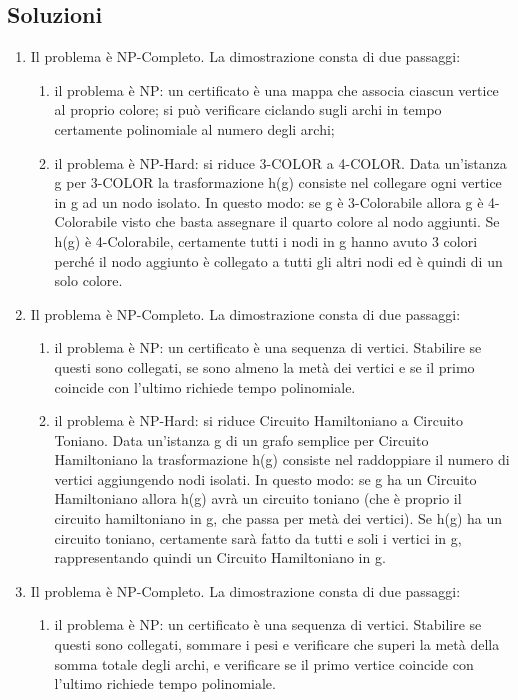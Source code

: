 \documentclass[a4paper,11pt]{article}
\begin{document}
\subsection{Soluzioni}
\begin{enumerate}
    \item Il problema è NP-Completo. La dimostrazione consta di due passaggi:
    \begin{enumerate}
    \item il problema è NP: un certificato è una mappa che associa ciascun vertice al proprio colore; si può verificare ciclando sugli archi in tempo certamente polinomiale al numero degli archi; 
    \item il problema è NP-Hard: si riduce 3-COLOR a 4-COLOR. Data un'istanza g per 3-COLOR la trasformazione h(g) consiste nel collegare ogni vertice in g ad un nodo isolato. In questo modo: se g è 3-Colorabile allora g è 4-Colorabile visto che basta assegnare il quarto colore al nodo aggiunti. Se h(g) è 4-Colorabile, certamente tutti i nodi in g hanno avuto 3 colori perché il nodo aggiunto è collegato a tutti gli altri nodi ed è quindi di un solo colore.
    \end{enumerate}
    \item Il problema è NP-Completo. La dimostrazione consta di due passaggi:
    \begin{enumerate}
    \item il problema è NP: un certificato è una sequenza di vertici. Stabilire se questi sono collegati, se sono almeno la metà dei vertici e se il primo coincide con l'ultimo richiede tempo polinomiale.
    \item il problema è NP-Hard: si riduce Circuito Hamiltoniano a Circuito Toniano. Data un'istanza g di un grafo semplice per Circuito Hamiltoniano la trasformazione h(g) consiste nel raddoppiare il numero di vertici aggiungendo nodi isolati. In questo modo: se g ha un Circuito Hamiltoniano allora h(g) avrà un circuito toniano (che è proprio il circuito hamiltoniano in g, che passa per metà dei vertici). Se h(g) ha un circuito toniano, certamente sarà fatto da tutti e soli i vertici in g, rappresentando quindi un Circuito Hamiltoniano in g.
    \end{enumerate}
    \item Il problema è NP-Completo. La dimostrazione consta di due passaggi:
    \begin{enumerate}
    \item il problema è NP: un certificato è una sequenza di vertici. Stabilire se questi sono collegati, sommare i pesi e verificare che superi la metà della somma totale degli archi, e verificare se il primo vertice coincide con l'ultimo richiede tempo polinomiale.

\end{enumerate}
\end{enumerate}
\end{document}
